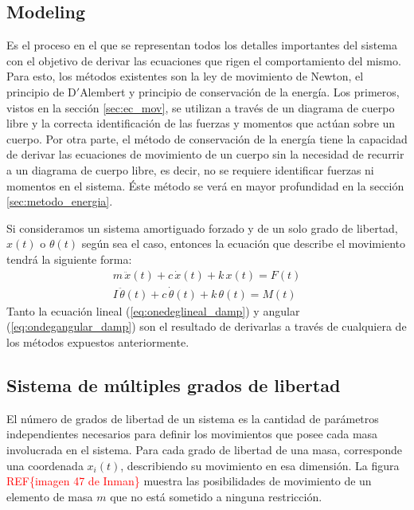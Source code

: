\subsection{Modeling}
Es el proceso en el que se representan todos los detalles importantes del sistema con el objetivo de derivar las ecuaciones que  rigen el comportamiento del mismo. Para esto, los métodos existentes son la ley de movimiento de Newton, el principio de D$'$Alembert y principio de conservación de la energía. Los primeros, vistos en la sección \ref{sec:ec_mov}, se utilizan a través de un diagrama de cuerpo libre y la correcta identificación de las fuerzas y momentos que actúan sobre un cuerpo. Por otra parte, el método de conservación de la energía tiene la capacidad de derivar las ecuaciones de movimiento de un cuerpo sin la necesidad de recurrir a un diagrama de cuerpo libre, es decir, no se requiere identificar fuerzas ni momentos en el sistema. Éste método se verá en mayor profundidad en la sección \ref{sec:metodo_energia}.

Si consideramos un sistema amortiguado forzado y de un solo grado de libertad, $x(t)$ o $\theta(t)$ según sea el caso, entonces la ecuación que describe el movimiento tendrá la siguiente forma:
\begin{subequations}
\begin{align}
	m\,\ddot{x}(t) + c\,\dot{x}(t) + k\,x(t) = F(t) \label{eq:onedeglineal_damp}\\
	I\,\ddot{\theta}(t) + c\,\dot{\theta}(t) + k\,\theta(t) = M(t) \label{eq:ondegangular_damp}
\end{align}
\end{subequations}
Tanto la ecuación lineal (\ref{eq:onedeglineal_damp}) y angular (\ref{eq:ondegangular_damp}) son el resultado de derivarlas a través de cualquiera de los métodos expuestos anteriormente.  
 
\subsection{Sistema de múltiples grados de libertad}
El número de grados de libertad de un sistema es la cantidad de parámetros independientes necesarios para definir los movimientos que posee cada masa involucrada en el sistema. Para cada grado de libertad de una masa, corresponde una coordenada $x_i(t)$, describiendo su movimiento en esa dimensión. La figura \textcolor{red}{REF\{imagen 47 de Inman\}} muestra las posibilidades de movimiento de un elemento de masa $m$ que no está sometido a ninguna restricción.

